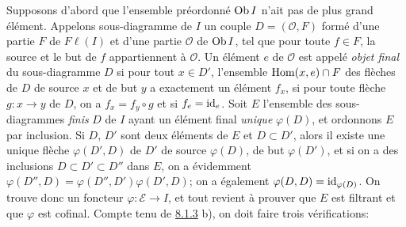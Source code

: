 \documentclass[10pt]{../fichiers-configuration-latex/smfart}
\begin{document}
Supposons d'abord que l'ensemble préordonné $\operatorname{Ob} I$ n'ait pas de
plus grand élément. Appelons sous-diagramme de $I$ un couple
$D=(\mathcal{O},F)$ formé d'une partie $F$ de $F\ell(I)$ et d'une
partie $\mathcal{O}$ de $\operatorname{Ob} I$, tel que pour toute $f\in F$, la
source et le but de $f$ appartiennent à $\mathcal{O}$. Un élément
$e$ de $\mathcal{O}$ est appelé \emph{objet final} du sous-diagramme
$D$ si pour tout $x\in D'$, l'ensemble $\operatorname{Hom}(x,e)\cap F$ des flèches
de $D$ de source $x$ et de but $y$ a exactement un élément $f_x$, si
pour toute flèche $g:x\rightarrow y$ de $D$, on a $f_x=f_y\circ g$
et si $f_e=\operatorname{id}_e$. Soit $E$ l'ensemble des sous-diagrammes
\emph{finis} $D$ de $I$ ayant un élément final \emph{unique}
$\varphi(D)$, et ordonnons $E$ par inclusion. Si $D$, $D'$ sont deux
éléments de $E$ et $D\subset D'$, alors il existe une unique flèche
$\varphi(D',D)$ de $D'$ de source $\varphi(D)$, de but
$\varphi(D')$, et si on a des inclusions $D\subset D'\subset D''$
dans $E$, on a évidemment
$\varphi(D'',D)=\varphi(D'',D')\varphi(D',D)$; on a également
$\varphi(D,D)=\operatorname{id}_{\varphi(D)}$. On trouve donc un foncteur
$\varphi:ℰ\rightarrow I$, et tout revient à prouver que $E$
est filtrant et que $\varphi$ est cofinal. Compte tenu de
\hyperref[I.prop8.1.3]{8.1.3} b), on doit faire trois vérifications:
\end{document}
